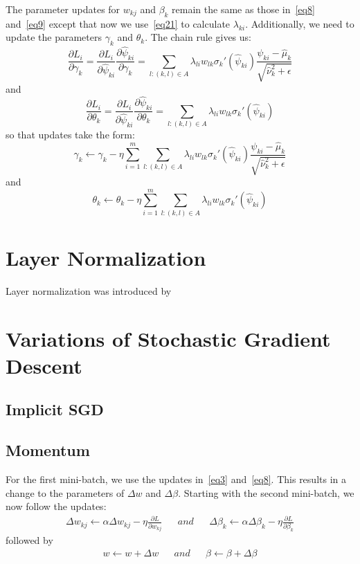 \documentclass[11pt]{article}
\begin{document}
The parameter updates for $w_{kj}$ and $\beta_k$ remain the same as those in~\eqref{eq8} and~\eqref{eq9} except that now we use~\eqref{eq21} to calculate $\lambda_{ki}$.
Additionally, we need to update the parameters $\gamma_k$ and $\theta_k$. The chain rule gives us:
\begin{equation}
\frac{\partial L_i}{\partial \gamma_k} = \frac{\partial L_i}{\partial \widehat{\psi}_{ki}} \frac{\partial \widehat{\psi}_{ki}}{\partial \gamma_k}
= \sum_{l:\left(k,l\right) \in A} \lambda_{li} w_{lk} \sigma_k' \left( \widehat{\psi}_{ki} \right) \frac{\psi_{ki} - \widehat{\mu}_k}{\sqrt{\widehat{\nu}_k^2 + \epsilon}}
\end{equation}
and
\begin{equation}
\frac{\partial L_i}{\partial \theta_k} = \frac{\partial L_i}{\partial \widehat{\psi}_{ki}} \frac{\partial \widehat{\psi}_{ki}}{\partial \theta_k}
= \sum_{l:\left(k,l\right) \in A} \lambda_{li} w_{lk} \sigma_k' \left( \widehat{\psi}_{ki} \right)
\end{equation}
so that updates take the form:
\begin{equation}
\gamma_k \leftarrow \gamma_k - \eta \sum_{i=1}^m \sum_{l:\left(k,l\right) \in A} \lambda_{li} w_{lk} \sigma_k' \left( \widehat{\psi}_{ki} \right) \frac{\psi_{ki} - \widehat{\mu}_k}{\sqrt{\widehat{\nu}_k^2 + \epsilon}}
\end{equation}
and
\begin{equation}
\theta_k \leftarrow \theta_k - \eta \sum_{i=1}^m \sum_{l:\left(k,l\right) \in A} \lambda_{li} w_{lk} \sigma_k' \left( \widehat{\psi}_{ki} \right)
\end{equation}

\section{Layer Normalization}
Layer normalization was introduced by \cite{ba2016layer}

\section{Variations of Stochastic Gradient Descent}
\subsection{Implicit SGD}
\subsection{Momentum}
For the first mini-batch, we use the updates in~\eqref{eq3} and~\eqref{eq8}. This results in a change to the parameters of $\Delta w$ and $\Delta \beta$.
Starting with the second mini-batch, we now follow the updates:
\begin{align}
\Delta w_{kj} \leftarrow \alpha \Delta w_{kj} - \eta \frac{\partial L}{\partial w_{kj}} && and && \Delta \beta_k \leftarrow \alpha \Delta \beta_k - \eta \frac{\partial L}{\partial \beta_k}
\end{align}
followed by
\begin{align}
w \leftarrow w + \Delta w && and && \beta \leftarrow \beta + \Delta \beta
\end{align}

\end{document}
